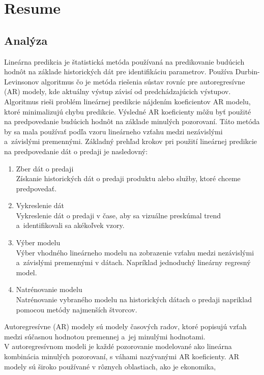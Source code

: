 \chapter{Resume} \label{resume}
    \section{Analýza} \label{sk:analytic}
    Lineárna predikcia je štatistická metóda používaná na predikovanie budúcich hodnôt na základe historických dát pre
    identifikáciu parametrov. Používa Durbin-Levinsonov algoritmus čo je metóda riešenia sústav rovníc pre
    autoregresívne (AR) modely, kde aktuálny výstup závisí od predchádzajúcich výstupov. Algoritmus
    rieši problém lineárnej predikcie nájdením koeficientov AR modelu, ktoré minimalizujú chybu predikcie. Výsledné AR
    koeficienty môžu byť použité na predpovedanie budúcich hodnôt na základe minulých pozorovaní. Táto metóda by sa mala
    používať podľa vzoru lineárneho vzťahu medzi nezávislými a~závislými premennými. Základný prehľad krokov
    pri použití lineárnej predikcie na predpovedanie dát o predaji je nasledovný:\\
    \begin{enumerate}
        \item Zber dát o predaji\\
        Získanie historických dát o predaji produktu alebo služby, ktoré chceme predpovedať.
        \item Vykreslenie dát\\
        Vykreslenie dát o predaji v čase, aby sa vizuálne preskúmal trend\\a~identifikovali sa akékoľvek vzory.
        \item Výber modelu\\
        Výber vhodného lineárneho modelu na zobrazenie vzťahu medzi nezávislými a~závislými
        premennými v dátach. Napríklad jednoduchý lineárny regresný model.
        \item Natrénovanie modelu\\
        Natrénovanie vybraného modelu na historických dátach o predaji napriklad pomocou metódy najmenších štvorcov.
    \end{enumerate}
    Autoregresívne (AR) modely sú modely časových radov, ktoré popisujú vzťah medzi súčasnou hodnotou premennej a~jej
    minulými hodnotami.\\V autoregresívnom modeli je každé pozorovanie modelované ako lineárna kombinácia minulých
    pozorovaní, s váhami nazývanými AR koeficienty. AR modely sú široko používané v rôznych oblastiach, ako je ekonomika,
